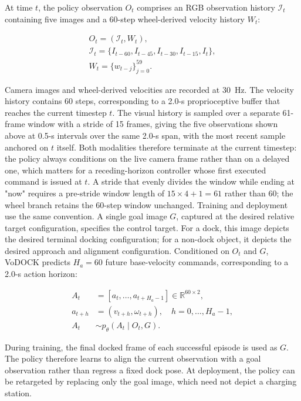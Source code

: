 \documentclass[letterpaper, 10 pt, conference]{IEEEtran}  %
\begin{document}
At time $t$, the policy observation $O_t$ comprises an RGB observation history $\mathcal{I}_t$ containing five images and a 60-step wheel-derived velocity history $W_t$:

\begin{equation}
\begin{aligned}
    O_t=(\mathcal{I}_t,W_t),\\
    \mathcal{I}_t=\{I_{t-60},I_{t-45},I_{t-30},I_{t-15},I_{t}\},\\
    W_t=\{w_{t-j}\}_{j=0}^{59}.
\end{aligned}
\end{equation}

Camera images and wheel-derived velocities are recorded at 30~Hz. The velocity history contains 60 steps, corresponding to a 2.0-s proprioceptive buffer that reaches the current timestep $t$. The visual history is sampled over a separate 61-frame window with a stride of 15 frames, giving the five observations shown above at 0.5-s intervals over the same 2.0-s span, with the most recent sample anchored on $t$ itself. Both modalities therefore terminate at the current timestep: the policy always conditions on the live camera frame rather than on a delayed one, which matters for a receding-horizon controller whose first executed command is issued at $t$. A stride that evenly divides the window while ending at "now" requires a pre-stride window length of $15\times4+1=61$ rather than 60; the wheel branch retains the 60-step window unchanged. Training and deployment use the same convention. A single goal image $G$, captured at the desired relative target configuration, specifies the control target. For a dock, this image depicts the desired terminal docking configuration; for a non-dock object, it depicts the desired approach and alignment configuration. Conditioned on $O_t$ and $G$, VoDOCK predicts $H_a=60$ future base-velocity commands, corresponding to a 2.0-s action horizon:

\begin{equation}
\begin{aligned}
A_t&=[a_t,\ldots,a_{t+H_a-1}]\in\mathbb{R}^{60\times2},\\
a_{t+h}&=(v_{t+h},\omega_{t+h}),\quad h=0,\ldots,H_a-1,\\
A_t&\sim p_\theta(A_t\mid O_t,G).
\end{aligned}
\end{equation}

During training, the final docked frame of each successful episode is used as $G$. The policy therefore learns to align the current observation with a goal observation rather than regress a fixed dock pose. At deployment, the policy can be retargeted by replacing only the goal image, which need not depict a charging station.
\end{document}
